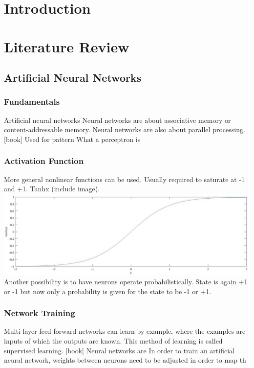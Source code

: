 \documentclass[11pt,a4paper]{article}
\begin{document}
\section{Introduction}
\newpage
\section{Literature Review}
\subsection{Artificial Neural Networks}
\subsubsection{Fundamentals}
Artificial neural networks  
Neural networks are about associative memory or content-addressable memory. Neural networks are also about parallel processing.[book] 
Used for pattern 
What a perceptron is

\subsubsection{Activation Function}
More general nonlinear functions can be used. Usually required to saturate at -1 and +1. Tanhx (include image). \\
\includegraphics[width=\textwidth]{tanh}
Another possibility is to have neurons operate probabilistically. State is again +1 or -1 but now only a probability is given for the state to be -1 or +1.

\subsubsection{Network Training}
Multi-layer feed forward networks can learn by example, where the examples are inputs of which the outputs are known. This method of learning is called supervised learning. [book]
Neural networks are In order to train an artificial neural network, weights between neurons need to be adjusted in order to map th
\end{document}
